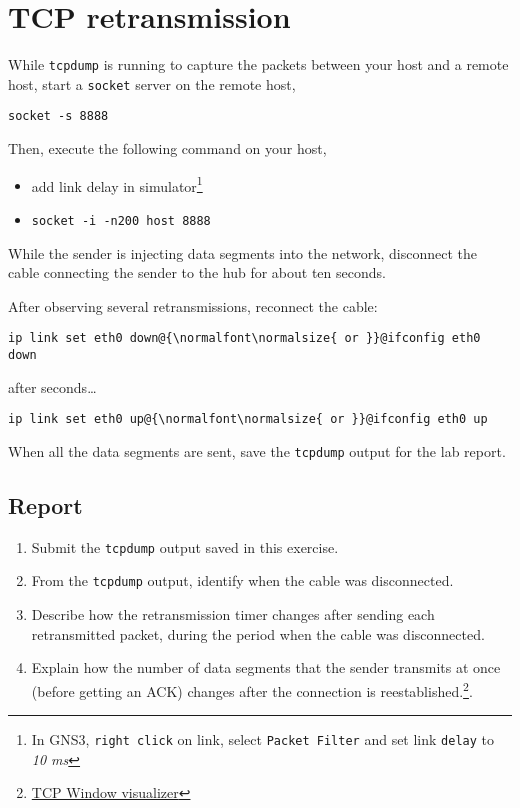 \documentclass{../UTNetLab}
\begin{document}
\section{TCP retransmission}
    While \lstinline{tcpdump} is running to capture the packets between your host and a remote host, start a \lstinline{socket} server on the remote host,
    \begin{lstlisting}
socket -s 8888
    \end{lstlisting}
    Then, execute the following command on your host,
    \begin{itemize}
        \item add link delay in simulator\footnote{In GNS3, \lstinline{right click} on link, select \lstinline{Packet Filter} and set link \lstinline{delay} to \textit{10 ms}}
        \item \lstinline[emph={host}]{socket -i -n200 host 8888}
    \end{itemize}
    While the sender is injecting data segments into the network, disconnect the cable connecting the sender to the hub for about ten seconds.

    After observing several retransmissions, reconnect the cable:
    \begin{lstlisting}
ip link set eth0 down@{\normalfont\normalsize{ or }}@ifconfig eth0 down
    \end{lstlisting}
after seconds\ldots
    \begin{lstlisting}
ip link set eth0 up@{\normalfont\normalsize{ or }}@ifconfig eth0 up
    \end{lstlisting}
    When all the data segments are sent, save the \lstinline{tcpdump} output for the lab report.
    
    \subsection*{Report}
    \begin{enumerate}
        \item Submit the \lstinline{tcpdump} output saved in this exercise.
        \item From the \lstinline{tcpdump} output, identify when the cable was disconnected.
        \item Describe how the retransmission timer changes after sending each retransmitted packet, during the period when the cable was disconnected.
        \item Explain how the number of data segments that the sender transmits at once (before getting an ACK) changes after the connection is reestablished.\footnote{\href{http://www.ccs-labs.org/teaching/rn/animations/gbn_sr/}{TCP Window visualizer}}.
    \end{enumerate}
    
\end{document}
